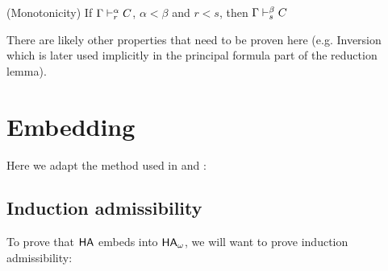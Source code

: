\begin{cththeorem}{(Monotonicity)}
    If $\seqd{\Gamma}{C}{\alpha}{r}$, $\alpha < \beta$ and $r < s$, then $\seqd{\Gamma}{C}{\beta}{s}$
  \end{cththeorem}

There are likely other properties that need to be proven here (e.g. Inversion which is later used implicitly in the principal formula part of the reduction lemma).

\section{Embedding}

Here we adapt the method used in \cite{SCH77} and \cite{BRY26}:

\subsection{Induction admissibility}

To prove that $\HA$ embeds into $\HA_\omega$, we will want to prove induction admissibility:

